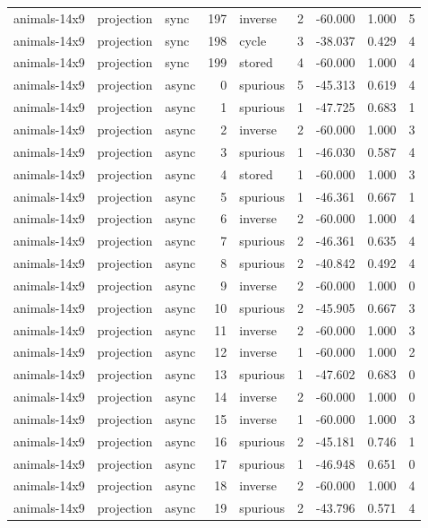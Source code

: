 \begin{tabular}{lllrlrrrr}
animals-14x9 & projection & sync & 197 & inverse & 2 & -60.000 & 1.000 & 5 \\
animals-14x9 & projection & sync & 198 & cycle & 3 & -38.037 & 0.429 & 4 \\
animals-14x9 & projection & sync & 199 & stored & 4 & -60.000 & 1.000 & 4 \\
animals-14x9 & projection & async & 0 & spurious & 5 & -45.313 & 0.619 & 4 \\
animals-14x9 & projection & async & 1 & spurious & 1 & -47.725 & 0.683 & 1 \\
animals-14x9 & projection & async & 2 & inverse & 2 & -60.000 & 1.000 & 3 \\
animals-14x9 & projection & async & 3 & spurious & 1 & -46.030 & 0.587 & 4 \\
animals-14x9 & projection & async & 4 & stored & 1 & -60.000 & 1.000 & 3 \\
animals-14x9 & projection & async & 5 & spurious & 1 & -46.361 & 0.667 & 1 \\
animals-14x9 & projection & async & 6 & inverse & 2 & -60.000 & 1.000 & 4 \\
animals-14x9 & projection & async & 7 & spurious & 2 & -46.361 & 0.635 & 4 \\
animals-14x9 & projection & async & 8 & spurious & 2 & -40.842 & 0.492 & 4 \\
animals-14x9 & projection & async & 9 & inverse & 2 & -60.000 & 1.000 & 0 \\
animals-14x9 & projection & async & 10 & spurious & 2 & -45.905 & 0.667 & 3 \\
animals-14x9 & projection & async & 11 & inverse & 2 & -60.000 & 1.000 & 3 \\
animals-14x9 & projection & async & 12 & inverse & 1 & -60.000 & 1.000 & 2 \\
animals-14x9 & projection & async & 13 & spurious & 1 & -47.602 & 0.683 & 0 \\
animals-14x9 & projection & async & 14 & inverse & 2 & -60.000 & 1.000 & 0 \\
animals-14x9 & projection & async & 15 & inverse & 1 & -60.000 & 1.000 & 3 \\
animals-14x9 & projection & async & 16 & spurious & 2 & -45.181 & 0.746 & 1 \\
animals-14x9 & projection & async & 17 & spurious & 1 & -46.948 & 0.651 & 0 \\
animals-14x9 & projection & async & 18 & inverse & 2 & -60.000 & 1.000 & 4 \\
animals-14x9 & projection & async & 19 & spurious & 2 & -43.796 & 0.571 & 4 \\

\end{tabular}
